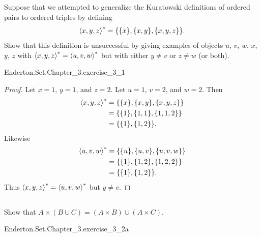 \documentclass{report}
\begin{document}
\subsection{}%

  Suppose that we attempted to generalize the Kuratowski definitions of ordered
    pairs to ordered triples by defining
    $$\left< x, y, z \right>^* = \{\{x\}, \{x, y\}, \{x, y, z\}\}.$$
  Show that this definition is unsuccessful by giving examples of objects
    $u$, $v$, $w$, $x$, $y$, $z$ with
    $\left< x, y, z \right>^* = \left< u, v, w \right>^*$ but with either
    $y \neq v$ or $z \neq w$ (or both).

    {Enderton.Set.Chapter\_3.exercise\_3\_1}

  \begin{proof}
    Let $x = 1$, $y = 1$, and $z = 2$.
    Let $u = 1$, $v = 2$, and $w = 2$.
    Then
      \begin{align*}
        \left< x, y, z \right>^*
          & = \{\{x\}, \{x, y\}, \{x, y, z\}\} \\
          & = \{\{1\}, \{1, 1\}, \{1, 1, 2\}\} \\
          & = \{\{1\}, \{1, 2\}\}.
      \end{align*}
    Likewise
      \begin{align*}
        \left< u, v, w \right>^*
          & = \{\{u\}, \{u, v\}, \{u, v, w\}\} \\
          & = \{\{1\}, \{1, 2\}, \{1, 2, 2\}\} \\
          & = \{\{1\}, \{1, 2\}\}.
      \end{align*}
    Thus $\left< x, y, z \right>^* = \left< u, v, w \right>^*$ but $y \neq v$.
  \end{proof}

\subsection{}%

  Show that $A \times (B \cup C) = (A \times B) \cup (A \times C)$.

    {Enderton.Set.Chapter\_3.exercise\_3\_2a}
\end{document}
